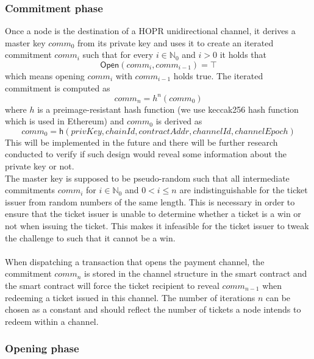 \subsubsection{Commitment phase}

Once a node is the destination of a HOPR unidirectional channel, it derives a
master key $comm_0$ from its private key and uses it to create an iterated
commitment $comm_i$ such that for every $i \in \mathbb{N}_0$ and $i > 0$ it
holds that $$ \mathsf{Open}(comm_{i}, comm_{i-1}) = \top $$ which means opening
$comm_{i}$ with $comm_{i-1}$ holds true.
The iterated commitment is computed as $$comm_n = h^n(comm_0)$$ where $h$ is a
preimage-resistant hash function (we use keccak256 hash function which is used
in Ethereum) and $comm_0$ is derived as $$ comm_0 = \mathsf{h}(privKey,chainId,
contractAddr, channelId, channelEpoch)$$
This will be implemented in the future and there will be further research
conducted to verify if such design would reveal some information about the
private key or not. \\The master key is supposed to be pseudo-random such that
all intermediate commitments $comm_{i}$ for $i \in \mathbb{N}_0$ and $0 < i \le
n$ are indistinguishable for the ticket issuer from random numbers of the same
length. This is necessary in order to ensure that the ticket issuer is unable to
determine whether a ticket is a win or not when issuing the ticket. This makes
it infeasible for the ticket issuer to tweak the challenge to such that it
cannot be a win.
\\~\\When dispatching a transaction that opens the payment channel, the
commitment $comm_n$ is stored in the channel structure in the smart contract and
the smart contract will force the ticket recipient to reveal $comm_{n-1}$ when
redeeming a ticket issued in this channel. The number of iterations $n$ can be
chosen as a constant and should reflect the number of tickets a node intends to
redeem within a channel.

\subsubsection{Opening phase}

